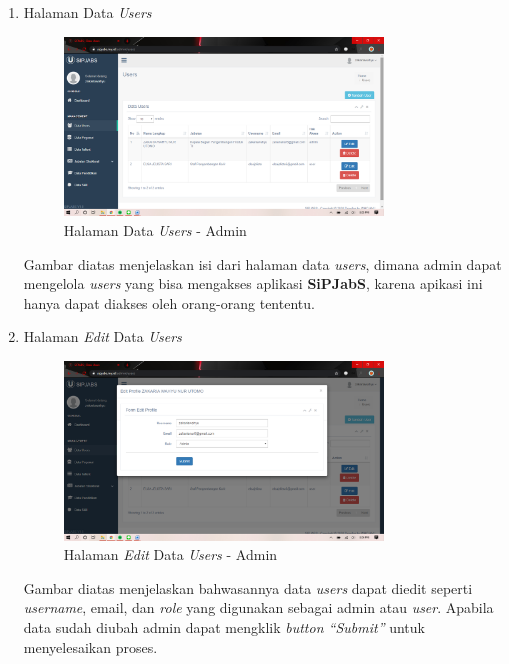 \begin{enumerate}
	\newpage
	\item Halaman Data \textit{Users}
	\begin{figure}
		\centering
		\includegraphics[width=0.8\textwidth]
		{pics/admin/implementasi/datausers.png}
		\caption{Halaman Data \textit{Users} - Admin}
		\label{fig:CC10}
	\end{figure}
	Gambar diatas menjelaskan isi dari halaman data \textit{users}, dimana admin dapat mengelola \textit{users} yang bisa mengakses aplikasi \textbf{SiPJabS}, karena apikasi ini hanya dapat diakses oleh orang-orang tententu. 
	
	\item Halaman \textit{Edit} Data \textit{Users}
	\begin{figure}
		\centering
		\includegraphics[width=0.8\textwidth]
		{pics/admin/implementasi/editusers.png}
		\caption{Halaman \textit{Edit} Data \textit{Users} - Admin}
		\label{fig:CC10}
	\end{figure}
	Gambar diatas menjelaskan bahwasannya data \textit{users} dapat diedit seperti \textit{username}, email, dan \textit{role} yang digunakan sebagai admin atau \textit{user}. Apabila data sudah diubah admin dapat mengklik \textit{button “Submit”} untuk menyelesaikan proses.
	

\end{enumerate}
